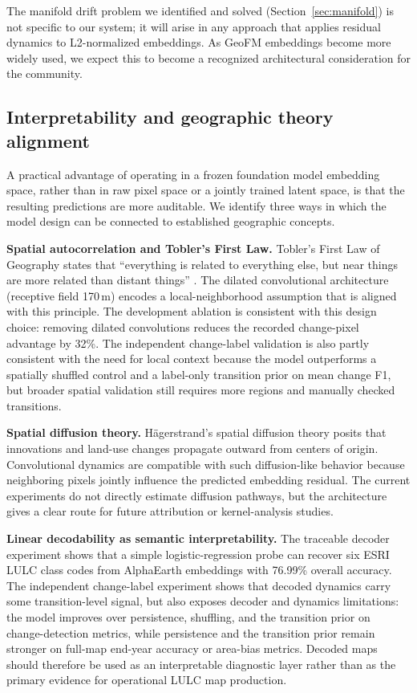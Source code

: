 \documentclass{article}
\begin{document}
The manifold drift problem we identified and solved (Section~\ref{sec:manifold}) is not specific to our system; it will arise in any approach that applies residual dynamics to L2-normalized embeddings. As GeoFM embeddings become more widely used, we expect this to become a recognized architectural consideration for the community.

\subsection{Interpretability and geographic theory alignment}
\label{sec:interpretability}

A practical advantage of operating in a frozen foundation model embedding space, rather than in raw pixel space or a jointly trained latent space, is that the resulting predictions are more auditable. We identify three ways in which the model design can be connected to established geographic concepts.

\textbf{Spatial autocorrelation and Tobler's First Law.}
Tobler's First Law of Geography states that ``everything is related to everything else, but near things are more related than distant things'' \citep{tobler1970computer}. The dilated convolutional architecture (receptive field 170\,m) encodes a local-neighborhood assumption that is aligned with this principle. The development ablation is consistent with this design choice: removing dilated convolutions reduces the recorded change-pixel advantage by 32\%. The independent change-label validation is also partly consistent with the need for local context because the model outperforms a spatially shuffled control and a label-only transition prior on mean change F1, but broader spatial validation still requires more regions and manually checked transitions.

\textbf{Spatial diffusion theory.}
H\"{a}gerstrand's spatial diffusion theory posits that innovations and land-use changes propagate outward from centers of origin. Convolutional dynamics are compatible with such diffusion-like behavior because neighboring pixels jointly influence the predicted embedding residual. The current experiments do not directly estimate diffusion pathways, but the architecture gives a clear route for future attribution or kernel-analysis studies.

\textbf{Linear decodability as semantic interpretability.}
The traceable decoder experiment shows that a simple logistic-regression probe can recover six ESRI LULC class codes from AlphaEarth embeddings with 76.99\% overall accuracy. The independent change-label experiment shows that decoded dynamics carry some transition-level signal, but also exposes decoder and dynamics limitations: the model improves over persistence, shuffling, and the transition prior on change-detection metrics, while persistence and the transition prior remain stronger on full-map end-year accuracy or area-bias metrics. Decoded maps should therefore be used as an interpretable diagnostic layer rather than as the primary evidence for operational LULC map production.
\end{document}
